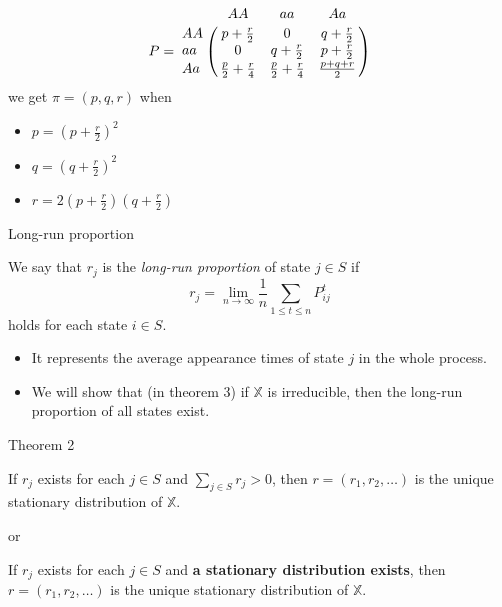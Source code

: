 \documentclass[mathserif]{beamer}
\begin{document}
\begin{frame}
	\begin{example}[cont.]
		\[
		P = 
		\bordermatrix{ ~ & AA                      & aa                      & Aa            \cr
			            AA & p+\frac{r}{2}           & 0                       & q+\frac{r}{2} \cr
			            aa & 0                       & q+\frac{r}{2}           & p+\frac{r}{2} \cr
			            Aa & \frac{p}{2}+\frac{r}{4} & \frac{p}{2}+\frac{r}{4} & \frac{p+q+r}{2} \cr}
		\]
		we get $\pi = (p, q, r)$ when
		\begin{itemize}
			\item $p = {\left( p + \frac{r}{2} \right)}^2$
			\item $q = {\left( q + \frac{r}{2} \right)}^2$
			\item $r = 2 \left( p + \frac{r}{2} \right)\left( q + \frac{r}{2} \right)$
		\end{itemize}
	\end{example}
\end{frame}

\begin{frame}{Long-run proportion}
	\begin{definition}
		We say that $r_j$ is the \textit{long-run proportion} of state $j \in S$ if
		\[
		r_j = \lim_{n\to\infty} \frac{1}{n} \sum_{1 \leq t \leq n} P^t_{ij}
		\]
		holds for each state $i \in S$.
	\end{definition}
	\begin{itemize}
		\item It represents the average appearance times of state $j$ in the whole process.
		\item We will show that (in theorem 3) if $\mathbb{X}$ is irreducible, then the long-run proportion of all states exist.
	\end{itemize}
\end{frame}

\begin{frame}{Theorem 2}
	\begin{theorem}[type 1]
	If $r_j$ exists for each $j \in S$ and $\sum_{j \in S} r_j > 0$,
	then $r = (r_1, r_2, \ldots)$ is the unique stationary distribution of $\mathbb{X}$.
	\end{theorem}
	or
	\begin{theorem}[type 2]
	If $r_j$ exists for each $j \in S$ and \textbf{a stationary distribution exists},
	then $r = (r_1, r_2, \ldots)$ is the unique stationary distribution of $\mathbb{X}$.
	\end{theorem}
\end{frame}
\end{document}
